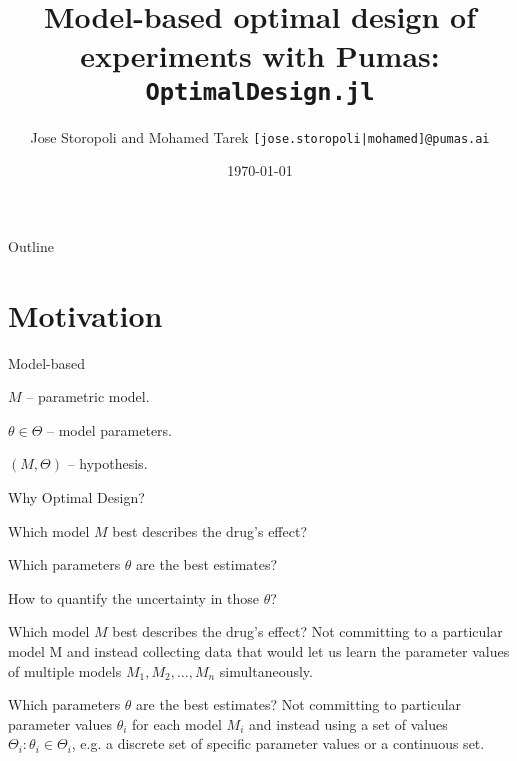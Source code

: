 \documentclass[aspectratio=169]{beamer}                    %
\title[\texttt{OptimalDesign.jl}]{Model-based optimal design of experiments with Pumas: \texttt{OptimalDesign.jl}}
\author[PumasAI]{Jose Storopoli and Mohamed Tarek \quad
	\texttt{[jose.storopoli|mohamed]@pumas.ai}}
\institute{PumasAI}
\date{\today}
\begin{document}
\maketitle

\begin{frame}{Outline}
	\tableofcontents
\end{frame}

\section{Motivation}
\begin{frame}{Model-based}
	\begin{vfilleditems}
		\item $M$ -- parametric model.
		\item $\theta \in \Theta$ -- model parameters.
		\item $(M, \Theta)$ -- hypothesis.
	\end{vfilleditems}
\end{frame}

\begin{frame}{Why Optimal Design?}
	\begin{vfilleditems}
		\item Which model $M$ best describes the drug's effect?
		\item Which parameters $\theta$ are the best estimates?
		\item How to quantify the uncertainty in those $\theta$?
	\end{vfilleditems}
\end{frame}

\begin{frame}{Which model $M$ best describes the drug's effect?}
	Not committing to a particular model M and instead collecting data
	that would let us learn the parameter values of multiple models
	$M_1, M_2, \ldots , M_n$ simultaneously.
\end{frame}

\begin{frame}{Which parameters $\theta$ are the best estimates?}
	Not committing to particular parameter values $\theta_i$ for
	each model $M_i$ and instead using a set of values
	$\Theta_i: \theta_i \in \Theta_i$,
	e.g. a discrete set of specific parameter values or a continuous set.
\end{frame}
\end{document}

